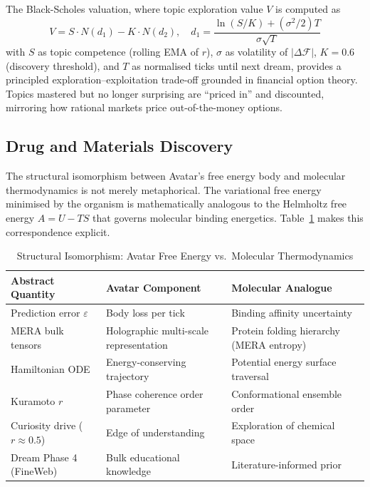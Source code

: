 \documentclass[12pt,a4paper]{article}
\begin{document}
The Black-Scholes valuation, where topic exploration value $V$ is computed as
\begin{equation}
  V = S \cdot N(d_1) - K \cdot N(d_2), \quad
  d_1 = \frac{\ln(S/K) + (\sigma^2/2)T}{\sigma\sqrt{T}}
\end{equation}
with $S$ as topic competence (rolling EMA of $r$), $\sigma$ as volatility of
$|\Delta\mathcal{F}|$, $K=0.6$ (discovery threshold), and $T$ as normalised ticks until
next dream, provides a principled exploration--exploitation trade-off grounded in
financial option theory. Topics mastered but no longer surprising are ``priced in'' and
discounted, mirroring how rational markets price out-of-the-money options.

\subsection{Drug and Materials Discovery}

The structural isomorphism between Avatar's free energy body and molecular thermodynamics
is not merely metaphorical. The variational free energy minimised by the organism is
mathematically analogous to the Helmholtz free energy $A = U - TS$ that governs
molecular binding energetics. Table~\ref{tab:fe-mapping} makes this correspondence
explicit.

\begin{table}[H]
\centering
\caption{Structural Isomorphism: Avatar Free Energy vs.\ Molecular Thermodynamics}
\label{tab:fe-mapping}
\small
\renewcommand{\arraystretch}{1.3}
\begin{tabularx}{\textwidth}{lXX}
\toprule
\rowcolor{avatarblue!15}
\textbf{Abstract Quantity} & \textbf{Avatar Component} & \textbf{Molecular Analogue} \\
\midrule
Prediction error $\varepsilon$ & Body loss per tick & Binding affinity uncertainty \\
\rowcolor{rowalt}
MERA bulk tensors & Holographic multi-scale representation & Protein folding hierarchy (MERA entropy) \\
Hamiltonian ODE & Energy-conserving trajectory & Potential energy surface traversal \\
\rowcolor{rowalt}
Kuramoto $r$ & Phase coherence order parameter & Conformational ensemble order \\
Curiosity drive ($r \approx 0.5$) & Edge of understanding & Exploration of chemical space \\
\rowcolor{rowalt}
Dream Phase 4 (FineWeb) & Bulk educational knowledge & Literature-informed prior \\
\bottomrule
\end{tabularx}
\end{table}
\end{document}
